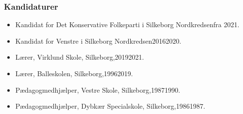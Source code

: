 \documentclass[11pt, a4paper]{awesome-cv}
\begin{document}
\begin{cvletter}
\subsubsection*{Kandidaturer}
\begin{itemize}
\item Kandidat for Det Konservative Folkeparti i Silkeborg Nordkredsenfra 2021.
\item Kandidat for Venstre i Silkeborg Nordkredsen20162020.
\end{itemize}
\begin{itemize}
\item Lærer, Virklund Skole, Silkeborg,20192021.
\item Lærer, Balleskolen, Silkeborg,19962019.
\item Pædagogmedhjælper, Vestre Skole, Silkeborg,19871990.
\item Pædagogmedhjælper, Dybkær Specialskole, Silkeborg,19861987.
\end{itemize}
\end{cvletter}
\end{document}
